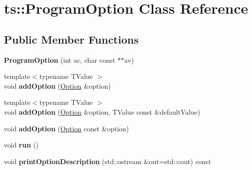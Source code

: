 \hypertarget{classts_1_1_program_option}{}\section{ts\+:\+:Program\+Option Class Reference}
\label{classts_1_1_program_option}
\subsection*{Public Member Functions}
\begin{DoxyCompactItemize}
\item 
\mbox{\label{classts_1_1_program_option_a5aa7d69a91efcef19deb1a281950bac2}} 
{\bfseries Program\+Option} (int ac, char const $\ast$$\ast$av)
\item 
\mbox{\label{classts_1_1_program_option_a337d103d0a77405e32e947099c4c3c7c}} 
{\footnotesize template$<$typename T\+Value $>$ }\\void {\bfseries add\+Option} (\hyperlink{structts_1_1_option}{Option} \&option)
\item 
\mbox{\label{classts_1_1_program_option_a23ae65a443f6aeed2b748b14802d75e2}} 
{\footnotesize template$<$typename T\+Value $>$ }\\void {\bfseries add\+Option} (\hyperlink{structts_1_1_option}{Option} \&option, T\+Value const \&default\+Value)
\item 
\mbox{\label{classts_1_1_program_option_ac79eaeb10a191f5fb83d35f4d35beae9}} 
void {\bfseries add\+Option} (\hyperlink{structts_1_1_option}{Option} const \&option)
\item 
\mbox{\label{classts_1_1_program_option_a37061a42e9fedbc863cf50a60737761c}} 
void {\bfseries run} ()
\item 
\mbox{\label{classts_1_1_program_option_a8b1d004f4a02f9688988a3aeb6058a77}} 
void {\bfseries print\+Option\+Description} (std\+::ostream \&out=std\+::cout) const
\item 
\mbox{\label{classts_1_1_program_option_a8fc28b81bf1ced5970c594d93de3a69c}} 
$$
\end{DoxyCompactItemize}
